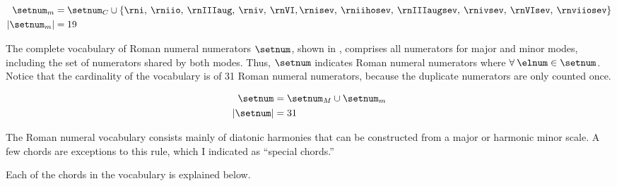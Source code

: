\begin{equation}
    \label{eq:minor_numerators}
    \begin{split}
    \setnum_{m} &= \setnum_{C} \cup  \{ \rni, \: \rniio, \: 
    \rnIIIaug, \: \rniv, \: \rnVI, \rnisev, \: \rniihosev, \: 
    \rnIIIaugsev, \: \rnivsev, \: \rnVIsev, \: \rnviiosev \} \\
    | \setnum_{m} | &= 19
    \end{split}
\end{equation}

The complete vocabulary of Roman numeral numerators
$\setnum$, shown in , comprises all
numerators for major and minor modes, including the set of
numerators shared by both modes. Thus, $\setnum$ indicates
Roman numeral numerators where $\forall \: \elnum \in
\setnum$. Notice that the cardinality of the vocabulary is
of 31 Roman numeral numerators, because the duplicate
numerators are only counted once.

\begin{equation}
    \label{eq:all_numerators}
    \begin{split}
    \setnum &= \setnum_{M} \cup \setnum_{m} \\
    | \setnum | &= 31
    \end{split}
\end{equation}


The Roman numeral vocabulary consists mainly of diatonic
harmonies that can be constructed from a major or harmonic
minor scale. A few chords are exceptions to this rule, \:
which I indicated as ``special chords.''

Each of the chords in the vocabulary is explained below.


